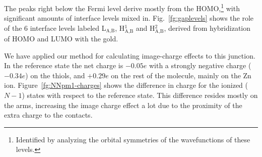 \documentclass[aip,jcp,a4paper,reprint,floatfix,superscriptaddress]{revtex4-1}
\newcommand{\txt}[1]{{\text{#1}}}
\begin{document}
The peaks right below the Fermi level derive mostly from the HOMO,\footnote{Identified by analyzing the orbital symmetries of the wavefunctions of these levels.} with significant amounts of interface levels mixed in.
Fig.~\ref{fg:gaplevels} shows the role of the 6 interface levels labeled L$_\text{A,B}$, H$^1_\text{A,B}$ and H$^2_\text{A,B}$, derived from hybridization of HOMO and LUMO with the gold. 


%
%
%

We have applied our method for calculating image-charge effects to this junction. In the reference state the net charge is $-0.05e$ with a strongly negative charge ($-0.34e$) on the thiols, and $+0.29e$ on the rest of the molecule, mainly on the Zn ion. Figure~\ref{fg:NNpm1-charges} shows the 
difference in charge for the ionized ($N-1$) states with respect to the reference state. This difference 
resides mostly on the arms, increasing the image charge effect a lot due to the proximity of the extra charge to the contacts. 
\end{document}
